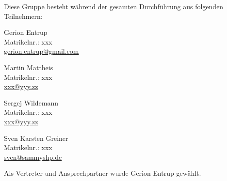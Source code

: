 Diese Gruppe besteht während der gesamten Durchführung aus folgenden Teilnehmern:

\begin{multicols}{2}
    \parbox{\textwidth}{
        Gerion Entrup\\
        Matrikelnr.: xxx\\
        \href{mailto://gerion.entrup@gmail.com}{gerion.entrup@gmail.com}
    }

    \parbox{\textwidth}{
        Martin Mattheis\\
        Matrikelnr.: xxx\\
        \href{mailto://xxx@yyy.zz}{xxx@yyy.zz}
    }

    \parbox{\textwidth}{
        Sergej Wildemann\\
        Matrikelnr.: xxx\\
        \href{mailto://xxx@yyy.zz}{xxx@yyy.zz}
    }

    \parbox{\textwidth}{
        Sven Karsten Greiner\\
        Matrikelnr.: xxx\\
        \href{mailto://sven@sammyshp.de}{sven@sammyshp.de}
    }
\end{multicols}

Als Vertreter und Ansprechpartner wurde Gerion Entrup gewählt.

